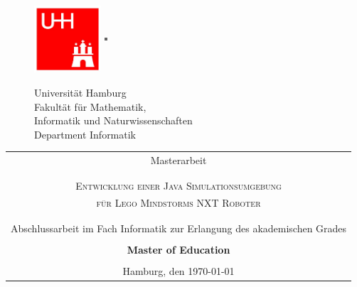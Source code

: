 \begin{titlepage}
\enlargethispage{\baselineskip}
\begin{figure}[htbp]
		\begin{minipage}[b]{25mm}
			\includegraphics[width=25mm,clip]{images/logo_uhh}
		\end{minipage}
		\begin{minipage}[b]{2mm}
			\includegraphics[width=1mm,height=25mm]{images/greypixel}
		\end{minipage}
		\begin{minipage}[b]{10cm}
			{   
				\vspace{2mm}
				{\Large Universität Hamburg } \\
				Fakultät für Mathematik,\\
				Informatik und Naturwissenschaften \\
				Department Informatik \\
			}
		\end{minipage}
	\end{figure}

\vspace{3ex} 
\begin{tabular}{c}
 \huge	Masterarbeit\\
 \\
 \small \\
 \large\textsc{Entwicklung einer Java Simulationsumgebung}\\
\large\textsc{für Lego Mindstorms NXT Roboter}
\\
\\
\\
\small Abschlussarbeit im Fach Informatik zur Erlangung des akademischen Grades\\
\\
\normalsize \textbf{Master of Education}\\
\\
\normalsize Hamburg, den \today


\end{tabular}
\end{titlepage}
